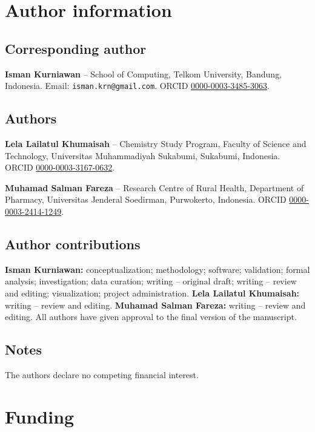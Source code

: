 \documentclass[letterpaper]{article}
\begin{document}
\section*{Author information}

\subsection*{Corresponding author}

\noindent
\textbf{Isman Kurniawan} -- School of Computing, Telkom University, Bandung,
Indonesia. Email: \texttt{isman.krn@gmail.com}.
ORCID \href{https://orcid.org/0000-0003-3485-3063}{0000-0003-3485-3063}.

\subsection*{Authors}

\noindent
\textbf{Lela Lailatul Khumaisah} -- Chemistry Study Program, Faculty of Science
and Technology, Universitas Muhammadiyah Sukabumi, Sukabumi, Indonesia.
ORCID \href{https://orcid.org/0000-0003-3167-0632}{0000-0003-3167-0632}.

\noindent
\textbf{Muhamad Salman Fareza} -- Research Centre of Rural Health, Department of
Pharmacy, Universitas Jenderal Soedirman, Purwokerto, Indonesia.
ORCID \href{https://orcid.org/0000-0003-2414-1249}{0000-0003-2414-1249}.

\subsection*{Author contributions}

\noindent
\textbf{Isman Kurniawan:} conceptualization; methodology; software; validation;
formal analysis; investigation; data curation; writing -- original draft;
writing -- review and editing; visualization; project administration.
\textbf{Lela Lailatul Khumaisah:} writing -- review and editing.
\textbf{Muhamad Salman Fareza:} writing -- review and editing.
All authors have given approval to the final version of the manuscript.

\subsection*{Notes}

The authors declare no competing financial interest.

\section*{Funding}
\end{document}
